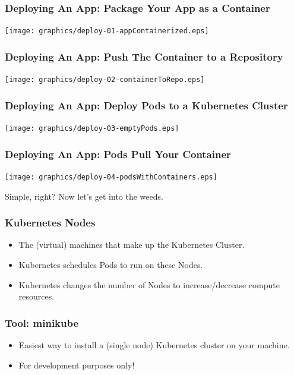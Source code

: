 \documentclass{beamer}
\begin{document}
\begin{frame}
    \frametitle{Deploying An App: Package Your App as a Container}
    \texttt{[image: graphics/deploy-01-appContainerized.eps]}
\end{frame}

\begin{frame}
    \frametitle{Deploying An App: Push The Container to a Repository}
    \texttt{[image: graphics/deploy-02-containerToRepo.eps]}
\end{frame}

\begin{frame}
    \frametitle{Deploying An App: Deploy Pods to a Kubernetes Cluster}
    \texttt{[image: graphics/deploy-03-emptyPods.eps]}
\end{frame}

\begin{frame}
    \frametitle{Deploying An App: Pods Pull Your Container}
    \texttt{[image: graphics/deploy-04-podsWithContainers.eps]}
\end{frame}

\begin{frame}
    \begin{center}
        \Huge Simple, right? Now let's get into the weeds.
    \end{center}
\end{frame}

\begin{frame}
    \frametitle{Kubernetes Nodes}
    \begin{itemize}
        \item The (virtual) machines that make up the Kubernetes Cluster.
        \item Kubernetes schedules Pods to run on these Nodes.
        \item Kubernetes changes the number of Nodes to increase/decrease compute resources.
    \end{itemize}
\end{frame}

\begin{frame}
    \frametitle{Tool: minikube\footnotemark}
    \begin{itemize}
        \item Easiest way to install a (single node) Kubernetes cluster on your machine.
        \item For development purposes only!
    \end{itemize}
\end{frame}
\end{document}
